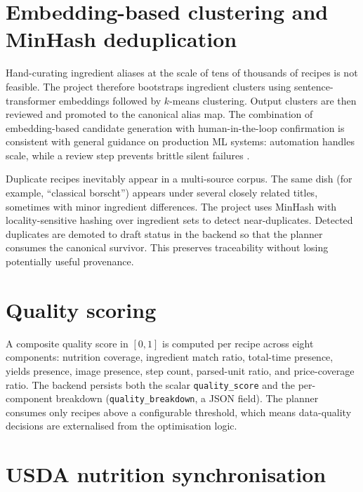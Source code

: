 \section{Embedding-based clustering and MinHash deduplication}

Hand-curating ingredient aliases at the scale of tens of thousands of recipes is not feasible. The project therefore bootstraps ingredient clusters using sentence-transformer embeddings followed by $k$-means clustering. Output clusters are then reviewed and promoted to the canonical alias map. The combination of embedding-based candidate generation with human-in-the-loop confirmation is consistent with general guidance on production ML systems: automation handles scale, while a review step prevents brittle silent failures \cite{sculley2015}.

Duplicate recipes inevitably appear in a multi-source corpus. The same dish (for example, ``classical borscht'') appears under several closely related titles, sometimes with minor ingredient differences. The project uses MinHash with locality-sensitive hashing over ingredient sets to detect near-duplicates. Detected duplicates are demoted to draft status in the backend so that the planner consumes the canonical survivor. This preserves traceability without losing potentially useful provenance.

\section{Quality scoring}

A composite quality score in $[0, 1]$ is computed per recipe across eight components: nutrition coverage, ingredient match ratio, total-time presence, yields presence, image presence, step count, parsed-unit ratio, and price-coverage ratio. The backend persists both the scalar \texttt{quality\_score} and the per-component breakdown (\texttt{quality\_breakdown}, a JSON field). The planner consumes only recipes above a configurable threshold, which means data-quality decisions are externalised from the optimisation logic.

\section{USDA nutrition synchronisation}

